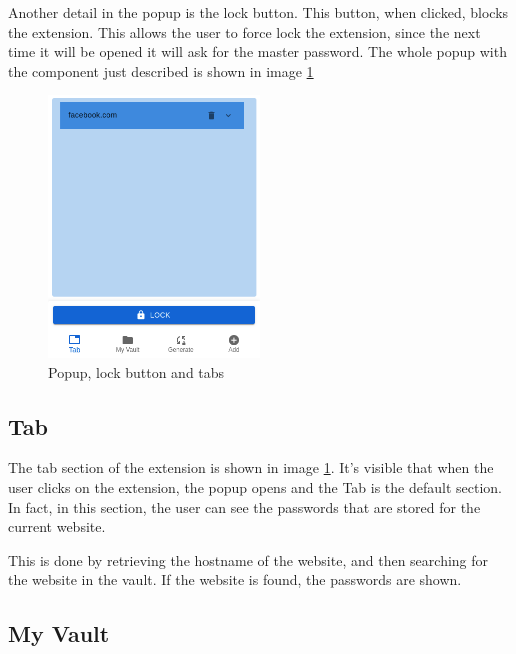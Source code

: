 
Another detail in the popup is the lock button. This button, when clicked, blocks the extension. This allows the user to force lock the extension, since the next time it will be opened it will ask for the master password.
The whole popup with the component just described is shown in image \ref*{fig:popup-lock-tab}

\begin{figure}[h!]
    \centering
    \vspace{0.5cm}
    \includegraphics[width=0.5\textwidth]{images/popup-lock-tab.png}
    \caption{Popup, lock button and tabs}
    \label{fig:popup-lock-tab} %
\end{figure}

\subsection {Tab}

The tab section of the extension is shown in image \ref{fig:popup-lock-tab}. It's visible that when the user clicks on the extension, the popup opens and the Tab is the default section. In fact, in this section, the user can see the passwords that are stored for the current website.

This is done by retrieving the hostname of the website, and then searching for the website in the vault. If the website is found, the passwords are shown.

\subsection {My Vault}

